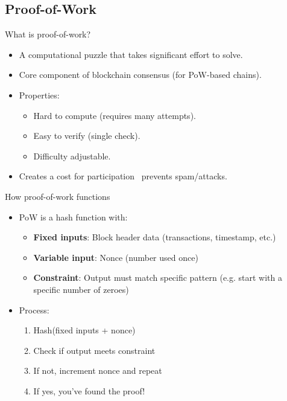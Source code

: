 \documentclass[aspectratio=169, lualatex, handout]{beamer}
\begin{document}
\subsection{Proof-of-Work}

\begin{frame}{What is proof-of-work?}
	\begin{itemize}
		\item A computational puzzle that takes significant effort to solve.
		\item Core component of blockchain consensus (for PoW-based chains).
		\item Properties:
		      \begin{itemize}
			      \item Hard to compute (requires many attempts).
			      \item Easy to verify (single check).
			      \item Difficulty adjustable.
		      \end{itemize}
		\item Creates a cost for participation \rightarrow\ prevents spam/attacks.
	\end{itemize}
\end{frame}

\begin{frame}{How proof-of-work functions}
	\begin{itemize}
		\item PoW is a hash function with:
		      \begin{itemize}
			      \item \textbf{Fixed inputs}: Block header data (transactions, timestamp, etc.)
			      \item \textbf{Variable input}: Nonce (number used once)
			      \item \textbf{Constraint}: Output must match specific pattern (e.g. start with a specific number of zeroes)
		      \end{itemize}
		\item Process:
		      \begin{enumerate}
			      \item Hash(fixed inputs + nonce)
			      \item Check if output meets constraint
			      \item If not, increment nonce and repeat
			      \item If yes, you've found the proof!
		      \end{enumerate}
	\end{itemize}
\end{frame}
\end{document}
